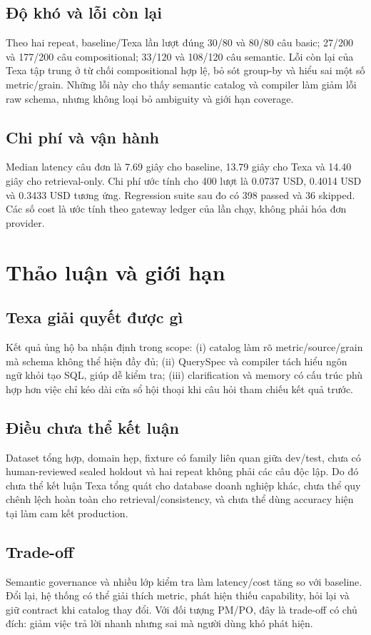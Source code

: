 \documentclass[11pt,a4paper]{article}
\begin{document}
\subsection{Độ khó và lỗi còn lại}
Theo hai repeat, baseline/Texa lần lượt đúng 30/80 và 80/80 câu basic; 27/200 và 177/200 câu compositional; 33/120 và 108/120 câu semantic. Lỗi còn lại của Texa tập trung ở từ chối compositional hợp lệ, bỏ sót group-by và hiểu sai một số metric/grain. Những lỗi này cho thấy semantic catalog và compiler làm giảm lỗi raw schema, nhưng không loại bỏ ambiguity và giới hạn coverage.
\subsection{Chi phí và vận hành}
Median latency câu đơn là 7.69 giây cho baseline, 13.79 giây cho Texa và 14.40 giây cho retrieval-only. Chi phí ước tính cho 400 lượt là 0.0737 USD, 0.4014 USD và 0.3433 USD tương ứng. Regression suite sau đo có 398 passed và 36 skipped. Các số cost là ước tính theo gateway ledger của lần chạy, không phải hóa đơn provider.

\section{Thảo luận và giới hạn}
\subsection{Texa giải quyết được gì}
Kết quả ủng hộ ba nhận định trong scope: (i) catalog làm rõ metric/source/grain mà schema không thể hiện đầy đủ; (ii) QuerySpec và compiler tách hiểu ngôn ngữ khỏi tạo SQL, giúp dễ kiểm tra; (iii) clarification và memory có cấu trúc phù hợp hơn việc chỉ kéo dài cửa sổ hội thoại khi câu hỏi tham chiếu kết quả trước.
\subsection{Điều chưa thể kết luận}
Dataset tổng hợp, domain hẹp, fixture có family liên quan giữa dev/test, chưa có human-reviewed sealed holdout và hai repeat không phải các câu độc lập. Do đó chưa thể kết luận Texa tổng quát cho database doanh nghiệp khác, chưa thể quy chênh lệch hoàn toàn cho retrieval/consistency, và chưa thể dùng accuracy hiện tại làm cam kết production.
\subsection{Trade-off}
Semantic governance và nhiều lớp kiểm tra làm latency/cost tăng so với baseline. Đổi lại, hệ thống có thể giải thích metric, phát hiện thiếu capability, hỏi lại và giữ contract khi catalog thay đổi. Với đối tượng PM/PO, đây là trade-off có chủ đích: giảm việc trả lời nhanh nhưng sai mà người dùng khó phát hiện.
\end{document}
